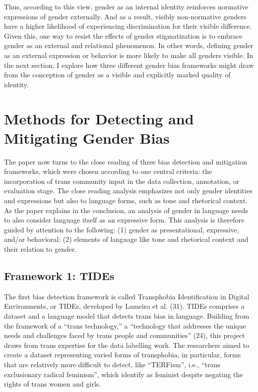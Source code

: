 \documentclass[11pt]{article}
\begin{document}
Thus, according to this view, gender as an internal identity reinforces normative expressions of gender externally. And as a result, visibly non-normative genders have a higher likelihood of experiencing discrimination for their visible difference. Given this, one way to resist the effects of gender stigmatization is to embrace gender as an external and relational phenomenon. In other words, defining gender as an external expression or behavior is more likely to make all genders visible. In the next section, I explore how three different gender bias frameworks might draw from the conception of gender as a visible and explicitly marked quality of identity.

\section{Methods for Detecting and Mitigating Gender Bias}
The paper now turns to the close reading of three bias detection and mitigation frameworks, which were chosen according to one central criteria: the incorporation of trans community input in the data collection, annotation, or evaluation stage. The close reading analysis emphasizes not only gender identities and expressions but also to language forms, such as tone and rhetorical context. As the paper explains in the conclusion, an analysis of gender in language needs to also consider language itself as an expressive form. This analysis is therefore guided by attention to the following: (1) gender as presentational, expressive, and/or behavioral; (2) elements of language like tone and rhetorical context and their relation to gender. 

\subsection{Framework 1: TIDEs}
The first bias detection framework is called Transphobia Identification in Digital Environments, or TIDEs, developed by Lameiro et al. (31). TIDEs comprises a dataset and a language model that detects trans bias in language. Building from the framework of a “trans technology,” a “technology that addresses the unique needs and challenges faced by trans people and communities” (24), this project draws from trans expertise for the data labelling work. The researchers aimed to create a dataset representing varied forms of transphobia, in particular, forms that are relatively more difficult to detect, like “TERFism”, i.e., “trans exclusionary radical feminism”, which identify as feminist despite negating the rights of trans women and girls. 
\end{document}
